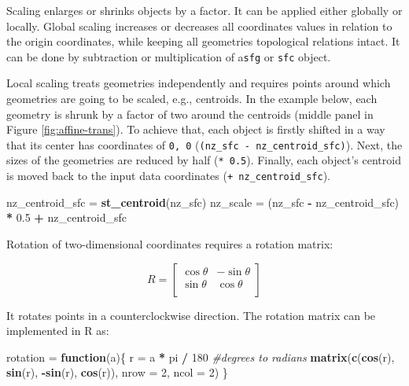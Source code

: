 \documentclass[]{krantz}
\newenvironment{Shaded}{\begin{snugshade}}{\end{snugshade}}
\newcommand{\CommentTok}[1]{\textcolor[rgb]{0.37,0.37,0.37}{\textit{#1}}}
\newcommand{\ControlFlowTok}[1]{\textcolor[rgb]{0.27,0.27,0.27}{\textbf{#1}}}
\newcommand{\DataTypeTok}[1]{\textcolor[rgb]{0.27,0.27,0.27}{#1}}
\newcommand{\DecValTok}[1]{\textcolor[rgb]{0.06,0.06,0.06}{#1}}
\newcommand{\FloatTok}[1]{\textcolor[rgb]{0.06,0.06,0.06}{#1}}
\newcommand{\KeywordTok}[1]{\textcolor[rgb]{0.27,0.27,0.27}{\textbf{#1}}}
\newcommand{\NormalTok}[1]{#1}
\newcommand{\OperatorTok}[1]{\textcolor[rgb]{0.43,0.43,0.43}{\textbf{#1}}}
\newcommand{\StringTok}[1]{\textcolor[rgb]{0.5,0.5,0.5}{#1}}
\begin{document}
Scaling enlarges or shrinks objects by a factor.
It can be applied either globally or locally.
Global scaling increases or decreases all coordinates values in relation to the origin coordinates, while keeping all geometries topological relations intact.
It can be done by subtraction or multiplication of a\texttt{sfg} or \texttt{sfc} object.

Local scaling treats geometries independently and requires points around which geometries are going to be scaled, e.g., centroids.
In the example below, each geometry is shrunk by a factor of two around the centroids (middle panel in Figure \ref{fig:affine-trans}).
To achieve that, each object is firstly shifted in a way that its center has coordinates of \texttt{0,\ 0} (\texttt{(nz\_sfc\ -\ nz\_centroid\_sfc)}).
Next, the sizes of the geometries are reduced by half (\texttt{*\ 0.5}).
Finally, each object's centroid is moved back to the input data coordinates (\texttt{+\ nz\_centroid\_sfc}).

\begin{Shaded}
\begin{Highlighting}[]
\NormalTok{nz_centroid_sfc =}\StringTok{ }\KeywordTok{st_centroid}\NormalTok{(nz_sfc)}
\NormalTok{nz_scale =}\StringTok{ }\NormalTok{(nz_sfc }\OperatorTok{-}\StringTok{ }\NormalTok{nz_centroid_sfc) }\OperatorTok{*}\StringTok{ }\FloatTok{0.5} \OperatorTok{+}\StringTok{ }\NormalTok{nz_centroid_sfc}
\end{Highlighting}
\end{Shaded}

Rotation of two-dimensional coordinates requires a rotation matrix:

\[
R =
\begin{bmatrix}
\cos \theta & -\sin \theta \\  
\sin \theta & \cos \theta \\
\end{bmatrix}
\]

It rotates points in a counterclockwise direction.
The rotation matrix can be implemented in R as:

\begin{Shaded}
\begin{Highlighting}[]
\NormalTok{rotation =}\StringTok{ }\ControlFlowTok{function}\NormalTok{(a)\{}
\NormalTok{  r =}\StringTok{ }\NormalTok{a }\OperatorTok{*}\StringTok{ }\NormalTok{pi }\OperatorTok{/}\StringTok{ }\DecValTok{180} \CommentTok{#degrees to radians}
  \KeywordTok{matrix}\NormalTok{(}\KeywordTok{c}\NormalTok{(}\KeywordTok{cos}\NormalTok{(r), }\KeywordTok{sin}\NormalTok{(r), }\OperatorTok{-}\KeywordTok{sin}\NormalTok{(r), }\KeywordTok{cos}\NormalTok{(r)), }\DataTypeTok{nrow =} \DecValTok{2}\NormalTok{, }\DataTypeTok{ncol =} \DecValTok{2}\NormalTok{)}
\NormalTok{\} }
\end{Highlighting}
\end{Shaded}
\end{document}
